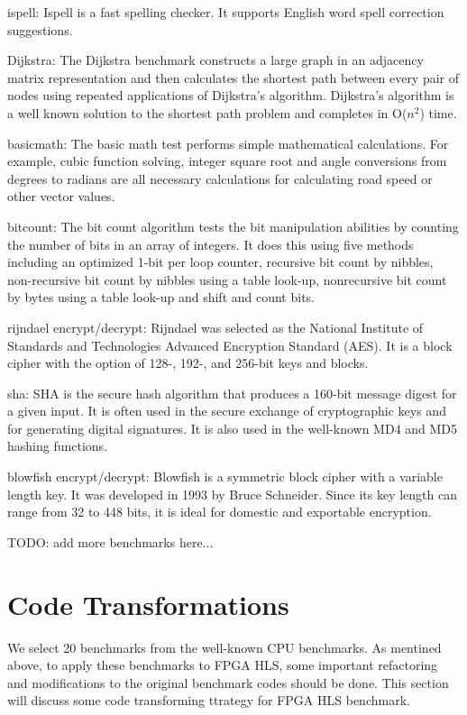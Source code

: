 \documentclass[conference]{IEEEtran}
\begin{document}
ispell: Ispell is a fast spelling checker. It supports English word spell correction suggestions.


Dijkstra: The Dijkstra benchmark constructs a large graph in an adjacency matrix representation and then calculates the shortest path between every pair of nodes using repeated applications of Dijkstra's algorithm. Dijkstra's algorithm is a well known solution to the shortest path problem and completes in O($n^2$) time.

basicmath: The basic math test performs simple mathematical calculations. For example, cubic function solving, integer square root and angle conversions from degrees to radians are all necessary calculations for calculating road speed or other vector values.

bitcount: The bit count algorithm tests the bit manipulation abilities by counting the number of bits in an array of integers. It does this using five methods including an optimized 1-bit per loop counter, recursive bit count by nibbles, non-recursive bit count by nibbles using a table look-up, nonrecursive bit count by bytes using a table look-up and shift and count bits.

rijndael encrypt/decrypt: Rijndael was selected as the National Institute of Standards and Technologies Advanced Encryption Standard (AES). It is a block cipher with the option of 128-, 192-, and 256-bit keys and blocks.

sha: SHA is the secure hash algorithm that produces a 160-bit message digest for a given input. It is often used in the secure exchange of cryptographic keys and for generating digital signatures. It is also used in the well-known MD4 and MD5 hashing functions.


blowfish encrypt/decrypt: Blowfish is a symmetric block cipher with a variable length key. It was developed in 1993 by Bruce Schneider. Since its key length can range from 32 to 448 bits, it is ideal for domestic and exportable encryption.


TODO: add more benchmarks here...


\section{Code Transformations}\label{section_code_transforming}
We select 20 benchmarks from the well-known CPU benchmarks. As mentined above, to apply these benchmarks to FPGA HLS, some important refactoring and modifications to the original benchmark codes should be done. This section will discuss some code transforming ttrategy for FPGA HLS benchmark.
\end{document}
